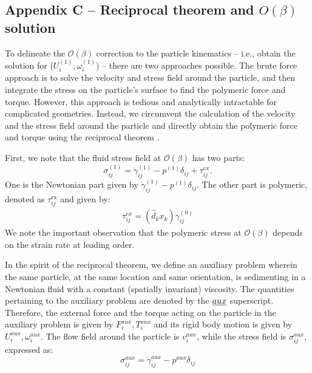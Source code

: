 \documentclass{jfm}
\begin{document}
\subsection{Appendix C -- Reciprocal theorem and $O(\beta)$ solution}


To delineate the $\mathcal{O}(\beta)$ correction to the particle kinematics -- i.e., obtain the solution for ($U_i^{(1)}, \omega_i^{(1)}$) -- there are two approaches possible. The brute force approach is to solve the velocity and stress field around the particle, and then integrate the stress on the particle's surface to find the polymeric force and torque. However, this approach is tedious and analytically intractable for complicated geometries. Instead, we circumvent the calculation of the velocity and the stress field around the particle and directly obtain the polymeric force and torque using the reciprocal theorem \citep{lealadvanced}.

First, we note that the fluid stress field at $\mathcal{O}(\beta)$  has two parts:
\begin{equation}
 \sigma_{ij}^{(1)} = \dot{\gamma}_{ij}^{(1)} -p^{(1)}\delta_{ij}+\tau_{ij}^{ex}.
 \end{equation}
 One is the Newtonian part given by $\dot{\gamma}_{ij}^{(1)} -p^{(1)}\delta_{ij}$.   The other part is polymeric, denoted as $\tau_{ij}^{\text{ex}}$ and given by:
\begin{align}
\tau_{ij}^{ex} = (\hat{d}_kx_k)\dot{\gamma}_{ij}^{(0)}
\end{align}
We note the important observation that the polymeric stress at $\mathcal{O}(\beta)$ depends on the strain rate at leading order.

In the spirit of the reciprocal theorem, we define an auxiliary problem wherein the same particle, at the same location and same orientation, is sedimenting in a Newtonian fluid with a constant (spatially invariant) viscosity. The quantities pertaining to the auxiliary problem are denoted by the $\emph{aux}$ superscript. Therefore, the external force and the torque acting on the particle in the auxiliary problem is given by $F_i^{aux},T_i^{aux}$ and its rigid body motion is given by $U_i^{aux},\omega^{aux}_i$. The flow field around the particle is $v_i^{aux}$, while the stress field is $\sigma_{ij}^{aux}$, expressed as:
\begin{equation}
    \sigma_{ij}^{aux} = \dot{\gamma}_{ij}^{aux} - p^{aux}\delta_{ij}
\end{equation}
\end{document}
